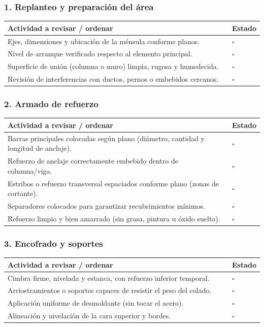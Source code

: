 \documentclass[12pt]{article}
\newcommand{\cbox}{\(\square\)}
\renewcommand{\cbox}{\(\square\)} %
\begin{document}
	\subsubsection*{1. Replanteo y preparación del área}
	\begin{tabularx}{\linewidth}{>{\raggedright\arraybackslash}p{0.93\linewidth} >{\centering\arraybackslash}m{0.07\linewidth}}
		\toprule
		\textbf{Actividad a revisar / ordenar} & \textbf{Estado}\\
		\midrule
		Ejes, dimensiones y ubicación de la ménsula conforme planos. & \cbox \\
		Nivel de arranque verificado respecto al elemento principal. & \cbox \\
		Superficie de unión (columna o muro) limpia, rugosa y humedecida. & \cbox \\
		Revisión de interferencias con ductos, pernos o embebidos cercanos. & \cbox \\
		\bottomrule
	\end{tabularx}
	
	\subsubsection*{2. Armado de refuerzo}
	\begin{tabularx}{\linewidth}{>{\raggedright\arraybackslash}p{0.93\linewidth} >{\centering\arraybackslash}m{0.07\linewidth}}
		\toprule
		\textbf{Actividad a revisar / ordenar} & \textbf{Estado}\\
		\midrule
		Barras principales colocadas según plano (diámetro, cantidad y longitud de anclaje). & \cbox \\
		Refuerzo de anclaje correctamente embebido dentro de columna/viga. & \cbox \\
		Estribos o refuerzo transversal espaciados conforme plano (zonas de cortante). & \cbox \\
		Separadores colocados para garantizar recubrimientos mínimos. & \cbox \\
		Refuerzo limpio y bien amarrado (sin grasa, pintura u óxido suelto). & \cbox \\
		\bottomrule
	\end{tabularx}
	
	\subsubsection*{3. Encofrado y soportes}
	\begin{tabularx}{\linewidth}{>{\raggedright\arraybackslash}p{0.93\linewidth} >{\centering\arraybackslash}m{0.07\linewidth}}
		\toprule
		\textbf{Actividad a revisar / ordenar} & \textbf{Estado}\\
		\midrule
		Cimbra firme, nivelada y estanca, con refuerzo inferior temporal. & \cbox \\
		Arriostramientos o soportes capaces de resistir el peso del colado. & \cbox \\
		Aplicación uniforme de desmoldante (sin tocar el acero). & \cbox \\
		Alineación y nivelación de la cara superior y bordes. & \cbox \\
		\bottomrule
	\end{tabularx}
	
\end{document}

